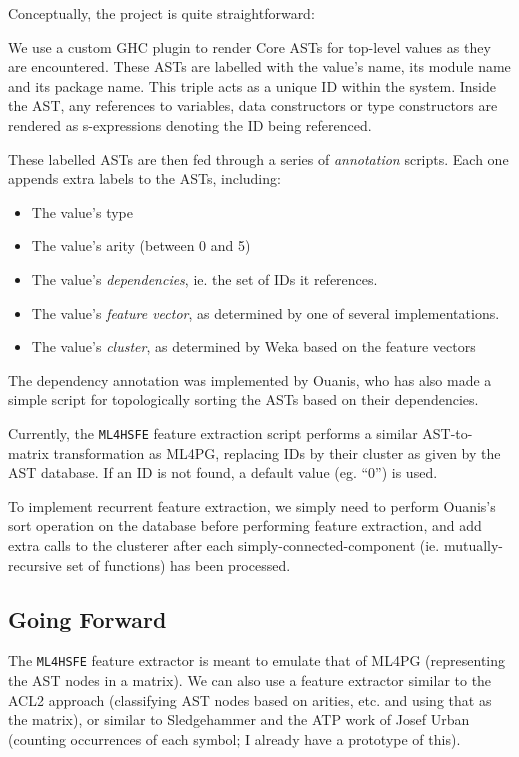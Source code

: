 \documentclass{article}
\begin{document}
Conceptually, the project is quite straightforward:

\immediate{}

We use a custom GHC plugin to render Core ASTs for top-level values as they are
encountered. These ASTs are labelled with the value's name, its module name and
its package name. This triple acts as a unique ID within the system. Inside the
AST, any references to variables, data constructors or type constructors are
rendered as s-expressions denoting the ID being referenced.

These labelled ASTs are then fed through a series of \emph{annotation} scripts.
Each one appends extra labels to the ASTs, including:

\begin{itemize}
  \item
    The value's type
  \item
    The value's arity (between 0 and 5)
  \item
    The value's \emph{dependencies}, ie. the set of IDs it references.
  \item
    The value's \emph{feature vector}, as determined by one of several implementations.
  \item
    The value's \emph{cluster}, as determined by Weka based on the feature vectors
\end{itemize}

The dependency annotation was implemented by Ouanis, who has also made a simple
script for topologically sorting the ASTs based on their dependencies.

Currently, the \texttt{ML4HSFE} feature extraction script performs a similar
AST-to-matrix transformation as ML4PG, replacing IDs by their cluster as given
by the AST database. If an ID is not found, a default value (eg. ``0'') is used.

To implement recurrent feature extraction, we simply need to perform Ouanis's
sort operation on the database before performing feature extraction, and add extra
calls to the clusterer after each simply-connected-component (ie. mutually-recursive set of functions) has been processed.

\subsection{Going Forward}

The \texttt{ML4HSFE} feature extractor is meant to emulate that of ML4PG (representing the AST nodes in a matrix). We can also use a feature extractor similar to the ACL2 approach (classifying AST nodes based on arities, etc. and using that as the matrix), or similar to Sledgehammer and the ATP work of Josef Urban (counting occurrences of each symbol; I already have a prototype of this).
\end{document}
